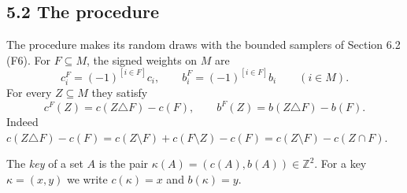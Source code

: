 \documentclass[10pt,a4paper]{article}
\begin{document}
\subsection*{5.2 The procedure}

The procedure makes its random draws with the bounded samplers of Section 6.2 (F6). For $F \subseteq M$, the signed
weights on $M$ are
\[c^F_i = (-1)^{[i\in F]}c_i,\qquad b^F_i = (-1)^{[i \in F]}b_i\qquad (i \in M).\]
For every $Z \subseteq M$ they satisfy
\[c^F(Z) = c(Z\triangle F) - c(F),\qquad b^F(Z) = b(Z\triangle F) - b(F). \tag{5.1}\]
Indeed $c(Z\triangle F) - c(F) = c(Z\setminus F) + c(F\setminus Z) - c(F) = c(Z\setminus F) - c(Z\cap F)$.

The \emph{key} of a set $A$ is the pair $\kappa(A) = (c(A), b(A)) \in \mathbb Z^2$. For a key $\kappa = (x, y)$ we write
$c(\kappa) = x$ and $b(\kappa) = y$.
\end{document}

